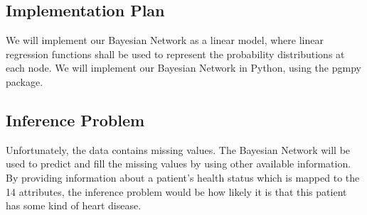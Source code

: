 \documentclass[a4paper]{article}
\begin{document}
\subsection*{Implementation Plan}

We will implement our Bayesian Network as a linear model, where linear regression functions shall be used to
represent the probability distributions at each node. We will implement our Bayesian Network in Python, using the
pgmpy package.


\subsection*{Inference Problem}

Unfortunately, the data contains missing values. The Bayesian Network will be used to predict and fill the missing values by using other available information. By providing information about a patient's health status which is mapped to the 14 attributes, the inference problem would be how likely it is that this patient has some kind of heart disease.
\end{document}
